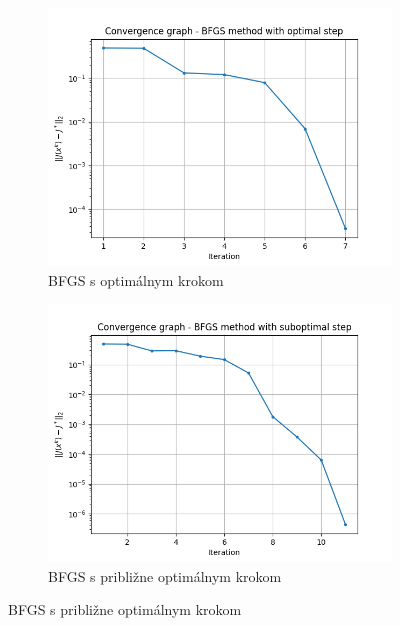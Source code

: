 \documentclass[report.tex]{subfiles}
\begin{document}
\begin{figure}[h!]
	\centering
	\begin{subfigure}[b]{0.4\linewidth}
		\includegraphics[width=\linewidth]{../../source/solvency_log_reg_results/BFGS_optimal.png}
		\caption{BFGS s optimálnym krokom}
	\end{subfigure}
	\begin{subfigure}[b]{0.4\linewidth}
		\includegraphics[width=\linewidth]{../../source/solvency_log_reg_results/BFGS_suboptimal.png}
		\caption{BFGS s približne optimálnym krokom}
	\end{subfigure}
	

\end{figure}
\end{document}
